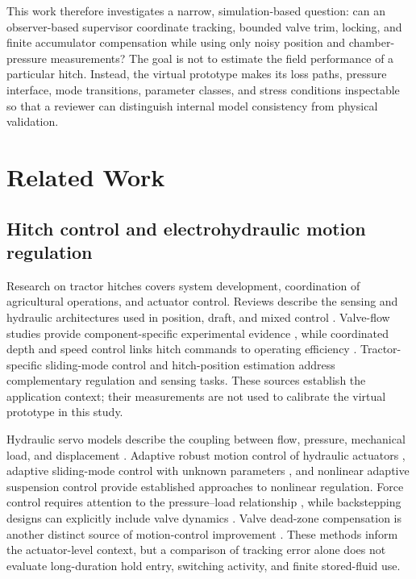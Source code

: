 \documentclass[machines,article,submit,pdftex,moreauthors]{Definitions/mdpi}
\begin{document}
This work therefore investigates a narrow, simulation-based question: can an observer-based supervisor coordinate tracking, bounded valve trim, locking, and finite accumulator compensation while using only noisy position and chamber-pressure measurements? The goal is not to estimate the field performance of a particular hitch. Instead, the virtual prototype makes its loss paths, pressure interface, mode transitions, parameter classes, and stress conditions inspectable so that a reviewer can distinguish internal model consistency from physical validation.

\section{Related Work}
\subsection{Hitch control and electrohydraulic motion regulation}
Research on tractor hitches covers system development, coordination of agricultural operations, and actuator control. Reviews describe the sensing and hydraulic architectures used in position, draft, and mixed control \cite{sun2022}. Valve-flow studies provide component-specific experimental evidence \cite{kumar2021}, while coordinated depth and speed control links hitch commands to operating efficiency \cite{sun2025}. Tractor-specific sliding-mode control \cite{liu2023} and hitch-position estimation \cite{kim2025} address complementary regulation and sensing tasks. These sources establish the application context; their measurements are not used to calibrate the virtual prototype in this study.

Hydraulic servo models describe the coupling between flow, pressure, mechanical load, and displacement \cite{jelali2003}. Adaptive robust motion control of hydraulic actuators \cite{yao2000}, adaptive sliding-mode control with unknown parameters \cite{guan2008}, and nonlinear adaptive suspension control \cite{alleyne1995} provide established approaches to nonlinear regulation. Force control requires attention to the pressure--load relationship \cite{alleyne2000}, while backstepping designs can explicitly include valve dynamics \cite{choux2010}. Valve dead-zone compensation is another distinct source of motion-control improvement \cite{deng2017}. These methods inform the actuator-level context, but a comparison of tracking error alone does not evaluate long-duration hold entry, switching activity, and finite stored-fluid use.
\end{document}
